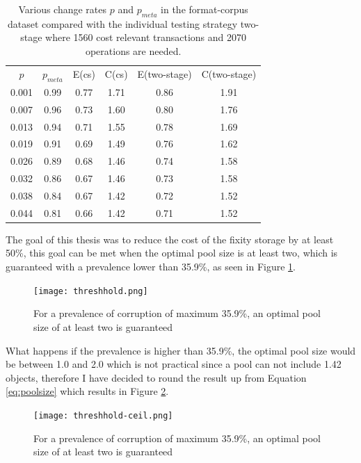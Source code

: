 \begin{table}[t]
    \centering
    \begin{tabular}{c c c c c c}
        $p$ & $p_{meta}$ & E(\acrshort{cs}) & C(\acrshort{cs}) & E(\acrshort{two-stage}) & C(\acrshort{two-stage})\\
        0.001 &	0.99 & 0.77 & 1.71 & 0.86 & 1.91 \\
        0.007 &	0.96 & 0.73 & 1.60 & 0.80 & 1.76 \\
        0.013 &	0.94 & 0.71 & 1.55 & 0.78 & 1.69 \\
        0.019 &	0.91 & 0.69 & 1.49 & 0.76 & 1.62 \\
        0.026 &	0.89 & 0.68 & 1.46 & 0.74 & 1.58 \\
        0.032 &	0.86 & 0.67 & 1.46 & 0.73 & 1.58 \\
        0.038 &	0.84 & 0.67 & 1.42 & 0.72 & 1.52 \\
        0.044 &	0.81 & 0.66 & 1.42 & 0.71 & 1.52 
    \end{tabular}
    \caption{Various change rates $p$ and $p_{meta}$ in the format-corpus dataset compared with the individual testing strategy \acrshort{two-stage} where 1560 cost relevant transactions and 2070 operations are needed.}
    \label{tb:split-off}
\end{table}

The goal of this thesis was to reduce the cost of the fixity storage by at least 50\%, this goal can be met when the optimal pool size is at least two, which is guaranteed with a prevalence lower than 35.9\%, as seen in Figure \ref{fig:threshhold}.
\begin{figure}[h]
    \caption{For a prevalence of corruption of maximum 35.9\%, an optimal pool size of at least two is guaranteed}
    \label{fig:threshhold}
    \centering
    \texttt{[image: threshhold.png]}
\end{figure}
What happens if the prevalence is higher than 35.9\%, the optimal pool size would be between 1.0 and 2.0 which is not practical since a pool can not include 1.42 objects, therefore I have decided to round the result up from Equation \ref{eq:poolsize} which results in Figure \ref{fig:threshhold-ceil}.
\begin{figure}[h]
    \caption{For a prevalence of corruption of maximum 35.9\%, an optimal pool size of at least two is guaranteed}
    \label{fig:threshhold-ceil}
    \centering
    \texttt{[image: threshhold-ceil.png]}
\end{figure}
